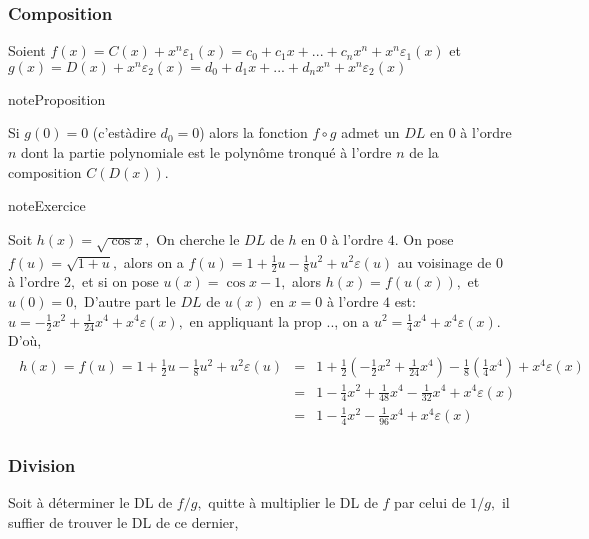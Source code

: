\documentclass[letterpaper,10pt,french]{jupyterBook}
\begin{document}
\subsubsection{Composition}
\label{\detokenize{dl:composition}}
\sphinxAtStartPar
Soient \(f(x)=C(x)+x^n \varepsilon_1 (x)=c_0+c_1 x+...+c_n x^n +x^n \varepsilon_1 (x)\) et \(g(x)=D(x)+x^n \varepsilon_2 (x)=d_0+d_1 x+...+d_n x^n +x^n \varepsilon_2 (x)\)

\begin{sphinxadmonition}{note}{Proposition}

\sphinxAtStartPar
Si \(g(0) = 0\) (c’est\sphinxhyphen{}à\sphinxhyphen{}dire \(d_0 = 0\)) alors la fonction \(f\circ g\) admet un \(DL\) en \(0\) à l’ordre \(n\) dont la partie polynomiale est le
polynôme tronqué à l’ordre \(n\) de la composition \(C(D(x)).\)
\end{sphinxadmonition}

\begin{sphinxadmonition}{note}{Exercice}

\sphinxAtStartPar
Soit \(h(x)=\sqrt{\cos x},\) On cherche le \(DL\) de \(h\) en \(0\) à l’ordre \(4.\) On pose \(f(u)=\sqrt{1+u},\) alors on a \(f(u)=1+\frac{1}{2}u-\frac{1}{8}u^2+u^2\varepsilon (u)\) au voisinage de \(0\) à l’ordre \(2,\) et si on pose \(u(x)=\cos x-1,\) alors \(h(x)=f(u(x)),\) et \(u(0)=0,\) D’autre part le \(DL\) de \(u(x)\) en \(x = 0\) à l’ordre \(4\) est: \(u=-\frac{1}{2}x^2+\frac{1}{24}x^4+x^4 \varepsilon(x),\) en appliquant la prop .., on a \(u^2=\frac{1}{4}x^4+x^4 \varepsilon(x).\) D’où,
\begin{equation*}
\begin{split}
\begin{eqnarray*}
h(x)=f(u)=1+\frac{1}{2}u-\frac{1}{8}u^2+u^2\varepsilon (u)
&=& 1+\frac{1}{2}(-\frac{1}{2}x^2+\frac{1}{24}x^4)-\frac{1}{8}(\frac{1}{4}x^4)+x^4 \varepsilon(x)\\
&=& 1-\frac{1}{4}x^2+\frac{1}{48}x^4-\frac{1}{32}x^4+x^4\varepsilon(x)\\
&=& 1-\frac{1}{4}x^2-\frac{1}{96}x^4+x^4\varepsilon(x)
\end{eqnarray*}
\end{split}
\end{equation*}\end{sphinxadmonition}


\subsubsection{Division}
\label{\detokenize{dl:division}}
\sphinxAtStartPar
Soit à déterminer le DL de \(f/g,\) quitte à multiplier le DL de \(f\) par celui de \(1/g,\) il suffier de trouver le DL  de ce dernier,
\end{document}
